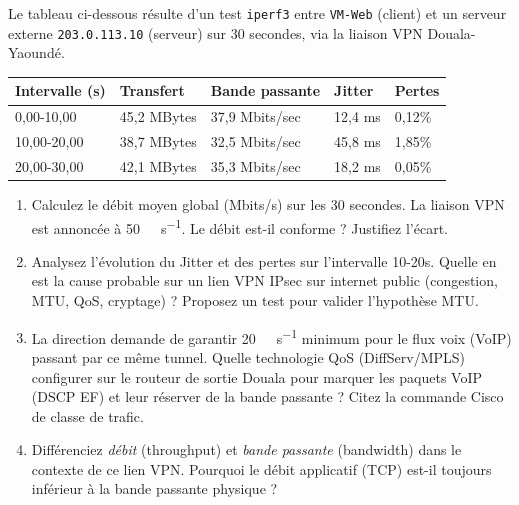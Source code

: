 \documentclass[11pt]{article}
\begin{document}
\begin{exercice}
Le tableau ci-dessous résulte d'un test \texttt{iperf3} entre \texttt{VM-Web} (client) et un serveur externe \texttt{203.0.113.10} (serveur) sur 30 secondes, via la liaison VPN Douala-Yaoundé.

\begin{tabularx}{\linewidth}{@{}lXXXX@{}}
\toprule
Intervalle (s) & Transfert & Bande passante & Jitter & Pertes \\
\midrule
0,00-10,00 & 45,2 MBytes & 37,9 Mbits/sec & 12,4 ms & 0,12\% \\
10,00-20,00 & 38,7 MBytes & 32,5 Mbits/sec & 45,8 ms & 1,85\% \\
20,00-30,00 & 42,1 MBytes & 35,3 Mbits/sec & 18,2 ms & 0,05\% \\
\bottomrule
\end{tabularx}

\begin{enumerate}
    \item Calculez le débit moyen global (Mbits/s) sur les 30 secondes. La liaison VPN est annoncée à \SI{50}{\mega\bit\per\second}. Le débit est-il conforme ? Justifiez l'écart.
    \item Analysez l'évolution du Jitter et des pertes sur l'intervalle 10-20s. Quelle en est la cause probable sur un lien VPN IPsec sur internet public (congestion, MTU, QoS, cryptage) ? Proposez un test pour valider l'hypothèse MTU.
    \item La direction demande de garantir \SI{20}{\mega\bit\per\second} minimum pour le flux voix (VoIP) passant par ce même tunnel. Quelle technologie QoS (DiffServ/MPLS) configurer sur le routeur de sortie Douala pour marquer les paquets VoIP (DSCP EF) et leur réserver de la bande passante ? Citez la commande Cisco de classe de trafic.
    \item Différenciez \textit{débit} (throughput) et \textit{bande passante} (bandwidth) dans le contexte de ce lien VPN. Pourquoi le débit applicatif (TCP) est-il toujours inférieur à la bande passante physique ?
\end{enumerate}
\end{exercice}
\end{document}
